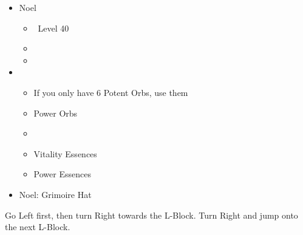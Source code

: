 \begin{menu}
  \begin{itemize}
    \crystarium
    \begin{itemize}
      \item Noel
            \begin{itemize}
              \item \sen\ Level 40
              \item {}
              \item {}
            \end{itemize}
      \item \chu
            \begin{itemize}
              \item If you only have 6 Potent Orbs, use them
              \item Power Orbs
              \item {}
              \item Vitality Essences
              \item Power Essences
            \end{itemize}
    \end{itemize}
    \equip
    \begin{itemize}
      \item Noel: Grimoire Hat
    \end{itemize}
  \end{itemize}
\end{menu}

Go Left first, then turn Right towards the L-Block. Turn Right and jump onto the next L-Block.

